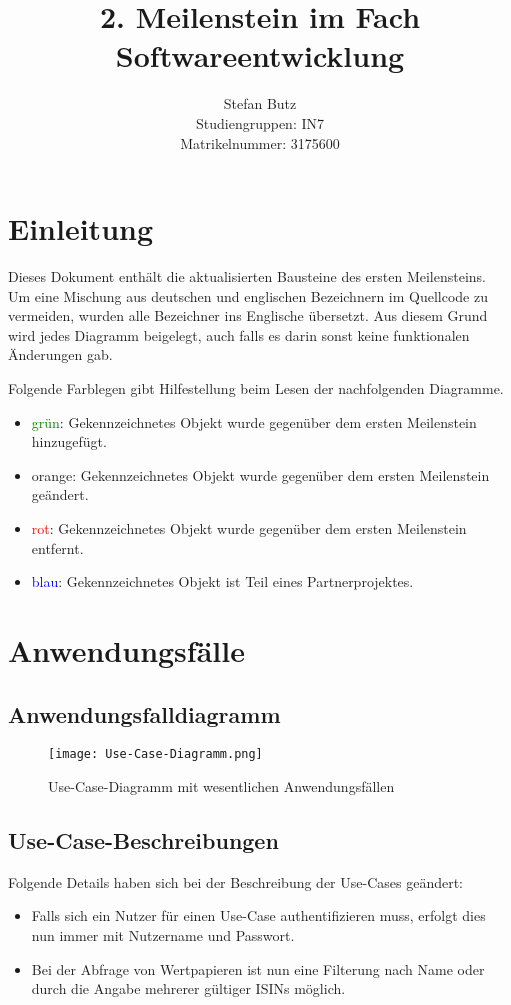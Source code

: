 \documentclass[12pt, a4paper, titlepage]{article}
\begin{document}
\title{2. Meilenstein im Fach Softwareentwicklung}
\author{Stefan Butz \\
		Studiengruppen: IN7 \\
		Matrikelnummer: 3175600}

\maketitle

\section{Einleitung}
Dieses Dokument enthält die aktualisierten Bausteine des ersten Meilensteins.
Um eine Mischung aus deutschen und englischen Bezeichnern im Quellcode zu
vermeiden, wurden alle Bezeichner ins Englische übersetzt.
Aus diesem Grund wird jedes Diagramm beigelegt, auch falls es darin sonst
keine funktionalen Änderungen gab.

Folgende Farblegen gibt Hilfestellung beim Lesen der nachfolgenden Diagramme.
\begin{itemize}
	\item \textcolor{green}{grün}:
	Gekennzeichnetes Objekt wurde gegenüber dem ersten Meilenstein hinzugefügt.
	\item \textcolor{YellowOrange}{orange}:
	Gekennzeichnetes Objekt wurde gegenüber dem ersten Meilenstein geändert.
	\item \textcolor{red}{rot}:
	Gekennzeichnetes Objekt wurde gegenüber dem ersten Meilenstein entfernt.
	\item \textcolor{blue}{blau}:
	Gekennzeichnetes Objekt ist Teil eines Partnerprojektes.
\end{itemize}

\clearpage
\section{Anwendungsfälle}
\subsection{Anwendungsfalldiagramm}
\begin{figure}[H]
	\centering
    \texttt{[image: Use-Case-Diagramm.png]}
	\caption{Use-Case-Diagramm mit wesentlichen Anwendungsfällen}
	\label{fig:use_case}
\end{figure}

\subsection{Use-Case-Beschreibungen}
Folgende Details haben sich bei der Beschreibung der Use-Cases geändert:
\begin{itemize}
	\item \textcolor{YellowOrange}{Falls sich ein Nutzer für einen Use-Case
	authentifizieren muss, erfolgt dies nun immer mit Nutzername und Passwort.}
	\item \textcolor{YellowOrange}{Bei der Abfrage von Wertpapieren ist nun eine
	Filterung nach Name oder durch die Angabe mehrerer gültiger ISINs möglich.}
\end{itemize}
\end{document}
